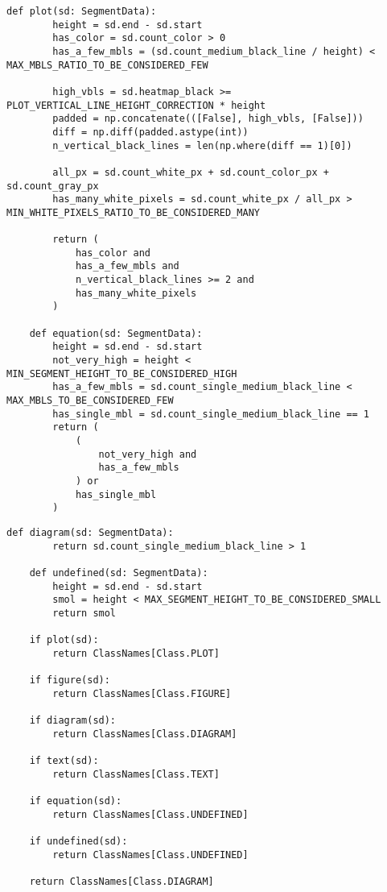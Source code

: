 \newpage

\begin{lstlisting}[caption={Функция handle\_medium\_black\_line (часть 2)}, label={lst:}]
    def plot(sd: SegmentData):
        height = sd.end - sd.start
        has_color = sd.count_color > 0
        has_a_few_mbls = (sd.count_medium_black_line / height) < MAX_MBLS_RATIO_TO_BE_CONSIDERED_FEW

        high_vbls = sd.heatmap_black >= PLOT_VERTICAL_LINE_HEIGHT_CORRECTION * height
        padded = np.concatenate(([False], high_vbls, [False]))
        diff = np.diff(padded.astype(int))
        n_vertical_black_lines = len(np.where(diff == 1)[0])

        all_px = sd.count_white_px + sd.count_color_px + sd.count_gray_px
        has_many_white_pixels = sd.count_white_px / all_px > MIN_WHITE_PIXELS_RATIO_TO_BE_CONSIDERED_MANY

        return (
            has_color and
            has_a_few_mbls and
            n_vertical_black_lines >= 2 and
            has_many_white_pixels
        )

    def equation(sd: SegmentData):
        height = sd.end - sd.start
        not_very_high = height < MIN_SEGMENT_HEIGHT_TO_BE_CONSIDERED_HIGH
        has_a_few_mbls = sd.count_single_medium_black_line < MAX_MBLS_TO_BE_CONSIDERED_FEW
        has_single_mbl = sd.count_single_medium_black_line == 1
        return (
            (
                not_very_high and
                has_a_few_mbls
            ) or
            has_single_mbl
        )
\end{lstlisting}

\newpage

\begin{lstlisting}[caption={Функция handle\_medium\_black\_line (часть 3)}, label={lst:}]
    def diagram(sd: SegmentData):
        return sd.count_single_medium_black_line > 1

    def undefined(sd: SegmentData):
        height = sd.end - sd.start
        smol = height < MAX_SEGMENT_HEIGHT_TO_BE_CONSIDERED_SMALL
        return smol

    if plot(sd):
        return ClassNames[Class.PLOT]

    if figure(sd):
        return ClassNames[Class.FIGURE]

    if diagram(sd):
        return ClassNames[Class.DIAGRAM]

    if text(sd):
        return ClassNames[Class.TEXT]

    if equation(sd):
        return ClassNames[Class.UNDEFINED]

    if undefined(sd):
        return ClassNames[Class.UNDEFINED]

    return ClassNames[Class.DIAGRAM]
\end{lstlisting}

